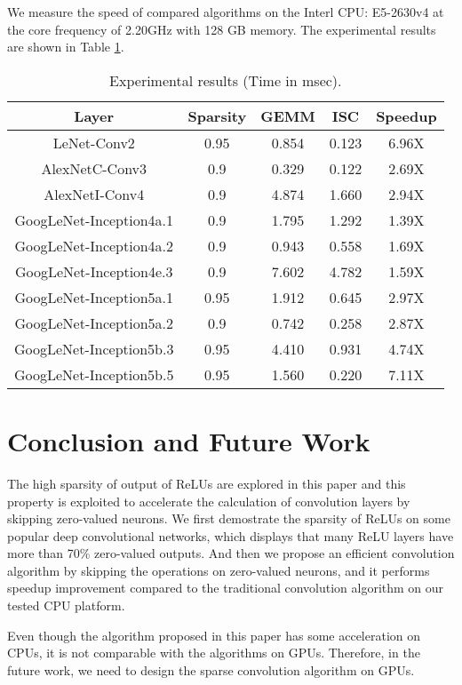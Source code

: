 \documentclass{article}
\begin{document}
We measure the speed of compared algorithms on the Interl CPU: E5-2630v4 at the core frequency of 2.20GHz with 128 GB memory. The experimental results are shown in Table \ref{table:cnnresults}.
\begin{table}[!ht]
\centering
\caption{Experimental results (Time in msec).}
\label{table:cnnresults}
\begin{tabular}{|c|c|c|c|c|}
\hline
	Layer&	 Sparsity &GEMM & ISC	&Speedup\\\cline{1-5}
\hline
\hline
LeNet-Conv2&    0.95    &0.854  &0.123  &6.96X \\\cline{1-5}
AlexNetC-Conv3& 0.9     &0.329  &0.122  &2.69X \\\cline{1-5}
AlexNetI-Conv4& 0.9     &4.874  &1.660  &2.94X \\\cline{1-5}
GoogLeNet-Inception4a.1&        0.9     &1.795  &1.292  &1.39X \\\cline{1-5}
GoogLeNet-Inception4a.2&        0.9     &0.943  &0.558  &1.69X \\\cline{1-5}
GoogLeNet-Inception4e.3&        0.9     &7.602  &4.782  &1.59X \\\cline{1-5}
GoogLeNet-Inception5a.1&        0.95    &1.912  &0.645  &2.97X \\\cline{1-5}
GoogLeNet-Inception5a.2&        0.9     &0.742  &0.258  &2.87X \\\cline{1-5}
GoogLeNet-Inception5b.3&        0.95    &4.410  &0.931  &4.74X \\\cline{1-5}
GoogLeNet-Inception5b.5&        0.95    &1.560  &0.220  &7.11X \\\cline{1-5}
\end{tabular}
\end{table}

\section{Conclusion and Future Work}
The high sparsity of output of ReLUs are explored in this paper and this property is exploited to accelerate the calculation of convolution layers by skipping zero-valued neurons. We first demostrate the sparsity of ReLUs on some popular deep convolutional networks, which displays that many ReLU layers have more than 70\% zero-valued outputs. And then we propose an efficient convolution algorithm by skipping the operations on zero-valued neurons, and it performs speedup improvement compared to the traditional convolution algorithm on our tested CPU platform.

Even though the algorithm proposed in this paper has some acceleration on CPUs, it is not comparable with the algorithms on GPUs. Therefore, in the future work, we need to design the sparse convolution algorithm on GPUs. 


% 

\end{document}
